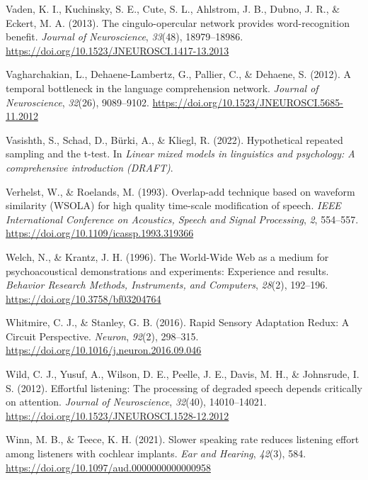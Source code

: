 \documentclass[a4paper, nobind]{templates/ociamthesis}
\newlength{\cslhangindent}
\newenvironment{CSLReferences}[2] %
 {%
  \setlength{\parindent}{0pt}
  \ifodd #1
  \let\oldpar\par
  \def\par{\hangindent=\cslhangindent\oldpar}
  \fi
  \setlength{\parskip}{1mm}
  \setlength{\baselineskip}{6mm}
 }%
 {}
\begin{document}
\begin{CSLReferences}{1}{0}
\leavevmode{}%
Vaden, K. I., Kuchinsky, S. E., Cute, S. L., Ahlstrom, J. B., Dubno, J. R., \& Eckert, M. A. (2013). {The cingulo-opercular network provides word-recognition benefit}. \emph{Journal of Neuroscience}, \emph{33}(48), 18979--18986. \url{https://doi.org/10.1523/JNEUROSCI.1417-13.2013}

\leavevmode{}%
Vagharchakian, L., Dehaene-Lambertz, G., Pallier, C., \& Dehaene, S. (2012). {A temporal bottleneck in the language comprehension network}. \emph{Journal of Neuroscience}, \emph{32}(26), 9089--9102. \url{https://doi.org/10.1523/JNEUROSCI.5685-11.2012}

\leavevmode{}%
Vasishth, S., Schad, D., Bürki, A., \& Kliegl, R. (2022). Hypothetical repeated sampling and the t-test. In \emph{Linear mixed models in linguistics and psychology: A comprehensive introduction (DRAFT)}.

\leavevmode{}%
Verhelst, W., \& Roelands, M. (1993). {Overlap-add technique based on waveform similarity (WSOLA) for high quality time-scale modification of speech}. \emph{IEEE International Conference on Acoustics, Speech and Signal Processing}, \emph{2}, 554--557. \url{https://doi.org/10.1109/icassp.1993.319366}

\leavevmode{}%
Welch, N., \& Krantz, J. H. (1996). {The World-Wide Web as a medium for psychoacoustical demonstrations and experiments: Experience and results}. \emph{Behavior Research Methods, Instruments, and Computers}, \emph{28}(2), 192--196. \url{https://doi.org/10.3758/bf03204764}

\leavevmode{}%
Whitmire, C. J., \& Stanley, G. B. (2016). {Rapid Sensory Adaptation Redux: A Circuit Perspective}. \emph{Neuron}, \emph{92}(2), 298--315. \url{https://doi.org/10.1016/j.neuron.2016.09.046}

\leavevmode{}%
Wild, C. J., Yusuf, A., Wilson, D. E., Peelle, J. E., Davis, M. H., \& Johnsrude, I. S. (2012). {Effortful listening: The processing of degraded speech depends critically on attention}. \emph{Journal of Neuroscience}, \emph{32}(40), 14010--14021. \url{https://doi.org/10.1523/JNEUROSCI.1528-12.2012}

\leavevmode{}%
Winn, M. B., \& Teece, K. H. (2021). {Slower speaking rate reduces listening effort among listeners with cochlear implants}. \emph{Ear and Hearing}, \emph{42}(3), 584. \url{https://doi.org/10.1097/aud.0000000000000958}


\end{CSLReferences}
\end{document}
